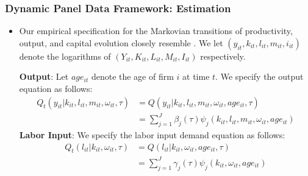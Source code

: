 \documentclass{beamer}
\begin{document}

\begin{frame}
\frametitle{Dynamic Panel Data Framework: Estimation}
\begin{itemize}
\item Our empirical specification for the Markovian transitions of productivity, output, and capital evolution closely resemble \cite{Arellano2017}.  We let $(y_{it}, k_{it}, l_{it}, m_{it}, i_{it})$ denote the logarithms of $(Y_{it}, K_{it}, L_{it}, M_{it}, I_{it})$ respectively.

\textbf{Output}:
Let $age_{it}$ denote the age of firm $i$ at time $t$. We specify the output equation as follows:
\begin{equation}\label{ymodel}
\begin{split}
Q_{t}(y_{it}|k_{it}, l_{it}, m_{it}, \omega_{it}, \tau)&=Q(y_{it}|k_{it}, l_{it}, m_{it}, \omega_{it}, age_{it}, \tau)\\
&=\sum_{j=1}^{J}\beta_{j}(\tau)\psi_{j}(k_{it}, l_{it}, m_{it}, \omega_{it}, age_{it})
\end{split}
\end{equation}
\textbf{Labor Input}:
We specify the labor input demand equation as follows:
\begin{equation} \label{lmodel}
\begin{split}
Q_{t}(l_{it}|k_{it}, \omega_{it}, \tau)&=Q(l_{it}|k_{it}, \omega_{it}, age_{it}, \tau)\\
&=\sum_{j=1}^{J}\gamma_{j}(\tau)\psi_{j}(k_{it}, \omega_{it}, age_{it})
\end{split}
\end{equation}
\end{itemize}
\end{frame}

\end{document}
